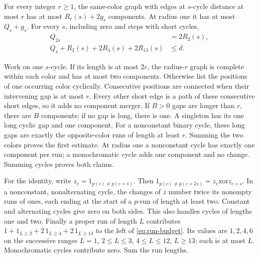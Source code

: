 \begin{lemma}\label{lem:binary-runs}
For every integer $r\ge1$, the same-color graph with edges at $s$-cycle distance at most $r$ has
at most $R_r(s)+2g_s$ components. At radius one it has at most $Q_s+g_s$.
For every $s$, including zero and steps with short cycles,
\begin{align}
 Q_{2s}&=2R_2(s),\label{eq:doubled-runs}\\
 Q_s+R_2(s)+2R_4(s)+2R_{13}(s)&\le d.\label{eq:run-budget}
\end{align}
\end{lemma}
\begin{outline}
Work on one $s$-cycle. If its length is at most $2r$, the radius-$r$
graph is complete within each color and has at most two components.
Otherwise list the positions of one occurring color cyclically. Consecutive
positions are connected when their intervening gap is at most $r$.
Every other short edge is a path of these consecutive short edges, so it
adds no component merger. If $B>0$ gaps are longer than $r$, there are
$B$ components; if no gap is long, there is one. A singleton has its
one long cyclic gap and one component. For a nonconstant binary cycle,
these long gaps are exactly the opposite-color runs of length at least
$r$. Summing the two colors proves the first estimate. At radius one a
nonconstant cycle has exactly one component per run; a monochromatic
cycle adds one component and no change. Summing cycles proves both claims.

For the identity, write $z_c=1_{p(c)\ne p(c+s)}$.
Then $1_{p(c)\ne p(c+2s)}=z_c\mathbin{\mathrm{xor}}z_{c+s}$.
In a nonconstant, nonalternating cycle, the changes of $z$ number twice
its nonempty runs of ones, each ending at the start of a $p$-run of length
at least two. Constant and alternating cycles give zero on both sides.
This also handles cycles of lengths one and two. Finally a proper run
of length $L$ contributes
$1+1_{L\ge2}+2\,1_{L\ge4}+2\,1_{L\ge13}$ to the left of
\eqref{eq:run-budget}. Its values are $1,2,4,6$ on the successive
ranges $L=1$, $2\le L\le3$, $4\le L\le12$, $L\ge13$; each is at most
$L$. Monochromatic cycles contribute zero. Sum the run lengths.
\end{outline}

